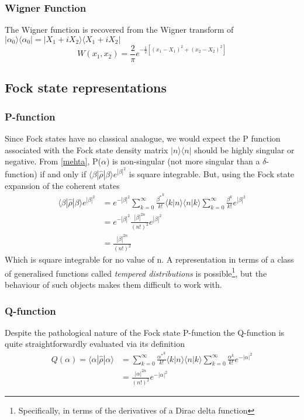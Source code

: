 \documentclass[reqno]{amsart}
\newcommand{\dens}{\hat{\rho}}
\newcommand{\ket}[1]{| #1 \rangle}
\newcommand{\bra}[1]{\langle #1 |}
\newcommand{\braket}[2]{\langle #1 | #2 \rangle}
\begin{document}
\subsubsection{Wigner Function}
The Wigner function is recovered from the Wigner transform of $\ket{\alpha_0}\bra{\alpha_0} = \ket{X_1+iX_2}\bra{X_1+iX_2}$
\begin{equation}
	W(x_1, x_2) = \frac{2}{ \pi} e^{-\frac{1}{2}[(x_1-X_1)^2+(x_2-X_2)^2]}
\end{equation}
\subsection{Fock state representations}
\subsubsection{P-function}

Since Fock states have no classical analogue, we would expect the P function associated with the Fock state density matrix $\ket{n}\bra{n}$ should be highly singular or negative. From \ref{mehta}, P($\alpha$) is non-singular (not more singular than a $\delta$-function) if and only if $ \bra{\beta} \dens \ket{\beta} e^{|\beta|^2} $ is square integrable. But, using the Fock state expansion of the coherent states
\begin{align}
	 \bra{\beta} \dens \ket{\beta} e^{|\beta|^2}  &= e^{-|\beta|^2} \sum_{k=0}^\infty \frac {{\beta^*}^k}{k!} \braket{k}{n}\braket{n}{k} \sum_{k=0}^\infty \frac {\beta^k}{k!}e^{|\beta|^2} \\ &= e^{-|\beta|^2} \frac{|\beta|^{2n}}{(n!)^2} e^{|\beta|^2} \\ &= \frac{|\beta|^{2n}}{(n!)^2}
\end{align}
Which is square integrable for no value of n.
A representation in terms of a class of generalised functions called \emph{tempered distributions} is possible\footnote{Specifically, in terms of the derivatives of a Dirac delta function\autocite{Gerry2005}}, but the behaviour of such objects makes them difficult to work with.
\subsubsection{Q-function}

Despite the pathological nature of the Fock state P-function the Q-function is quite straightforwardly evaluated via its definition
\begin{align}
	 Q(\alpha) = \bra{\alpha} \dens \ket{\alpha}  &= \sum_{k=0}^\infty \frac {{\alpha^*}^k}{k!} \braket{k}{n}\braket{n}{k} \sum_{k=0}^\infty \frac {\alpha^k}{k!}e^{-|\alpha|^2} \\ &= \frac{|\alpha|^{2n}}{(n!)^2} e^{-|\alpha|^2}
\end{align}
\end{document}
